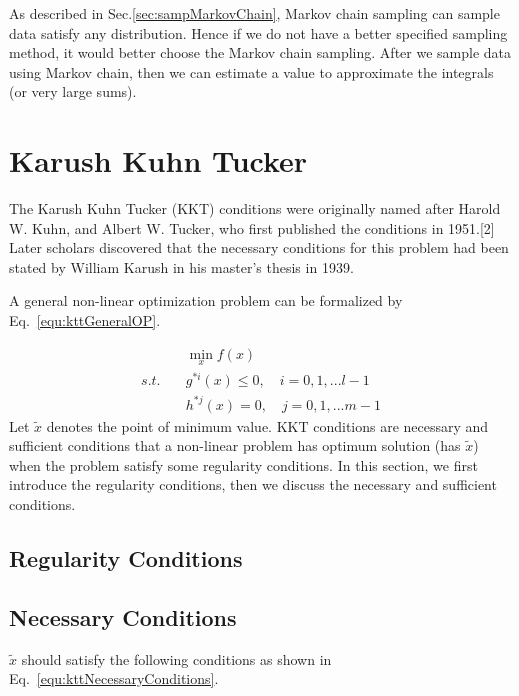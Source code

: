 \documentclass[runningheads,openany]{xhlPaper}
\begin{document}
As described in Sec.\ref{sec:sampMarkovChain}, Markov chain sampling can sample data satisfy any distribution. Hence if we do not have a better specified sampling method, it would better choose the Markov chain sampling.
After we sample data using Markov chain, then we can estimate a value to approximate the integrals (or very large sums).

\section{Karush Kuhn Tucker}
The Karush Kuhn Tucker (KKT) conditions were originally named after Harold W. Kuhn, and Albert W. Tucker, who first published the conditions in 1951.[2] Later scholars discovered that the necessary conditions for this problem had been stated by William Karush in his master's thesis in 1939.

A general non-linear optimization problem can be formalized by Eq.~\ref{equ:kttGeneralOP}.

\begin{equation}
\label{equ:kttGeneralOP}
\begin{aligned}
&\mathop {\min }\limits_x f\left( x \right)\\
s.t.\quad &{g^{*i}}\left( x \right) \le 0,\quad i = 0,1,...l - 1\\
&{h^{*j}}\left( x \right) = 0,\quad j = 0,1,...m - 1
\end{aligned}
\end{equation}
Let ${\tilde x}$ denotes the point of minimum value. KKT conditions are necessary and sufficient conditions that a non-linear problem has optimum solution (has ${\tilde x}$) when the problem satisfy some regularity conditions. 
In this section, we first introduce the regularity conditions, then we discuss the necessary and sufficient conditions.

\subsection{Regularity Conditions}


\subsection{Necessary Conditions}
${\tilde x}$ should satisfy the following conditions as shown in Eq.~\ref{equ:kttNecessaryConditions}.
\end{document}
